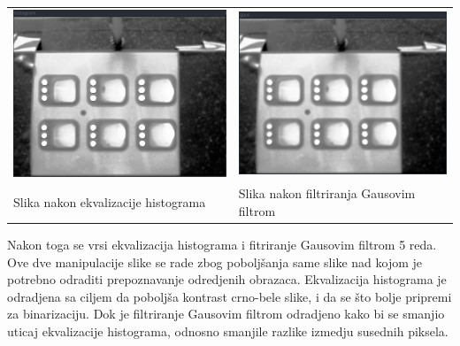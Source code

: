 \documentclass[a4paper,12pt, projekat]{etf}
\begin{document}
        \begin{table}[h!]
            \begin{tabular}{ll}
                \includegraphics[scale=0.3]{histogram.png} &
                \includegraphics[scale=0.3]{gauss.png} \\
                Slika nakon ekvalizacije histograma &
                Slika nakon filtriranja Gausovim filtrom
            \end{tabular}
        \end{table}

        Nakon toga se vrsi ekvalizacija histograma i fitriranje
        Gausovim filtrom 5 reda. Ove dve manipulacije slike se rade zbog
        pobolj\v{s}anja same slike nad kojom je potrebno odraditi prepoznavanje
        odredjenih obrazaca. Ekvalizacija histograma je odradjena sa ciljem da
        pobolj\v{s}a kontrast crno-bele slike, i da se \v{s}to bolje pripremi
        za binarizaciju. Dok je filtriranje Gausovim filtrom odradjeno kako bi
        se smanjio uticaj ekvalizacije histograma, odnosno smanjile razlike
        izmedju susednih piksela.
\end{document}
